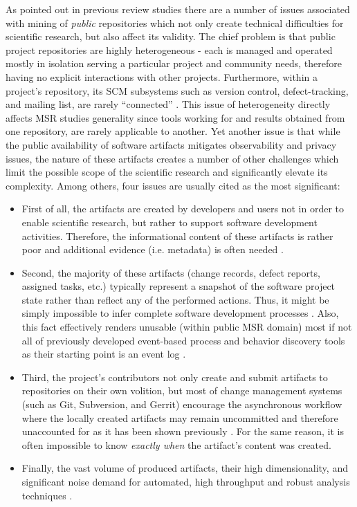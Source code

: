 As pointed out in previous review studies \cite{citeulike:12550438} \cite{citeulike:7853299} \cite{citeulike:7465518} there
are a number of issues associated with mining of \textit{public} repositories which not only create technical difficulties for 
scientific research, but also affect its validity. 
The chief problem is that public project repositories are highly heterogeneous - each is managed and operated 
mostly in isolation serving a particular project and community needs, therefore having no explicit interactions with 
other projects. 
Furthermore, within a project's repository, its SCM subsystems such as version control, defect-tracking, and mailing list, 
are rarely ``connected''  \cite{citeulike:13058334}. 
This issue of heterogeneity directly affects MSR studies generality since tools working for and results obtained from 
one repository, are rarely applicable to another.
Yet another issue is that while the public availability of software artifacts mitigates observability and privacy issues, 
the nature of these artifacts creates a number of other challenges which limit the possible scope of the scientific 
research and significantly elevate its complexity. Among others, four issues are usually cited as the most significant:
\begin{itemize}
 \item First of all, the artifacts are created by developers and users not in order to enable scientific research,
but rather to support software development activities. Therefore, the informational content of these artifacts is rather 
poor and additional evidence (i.e. metadata) is often needed \cite{citeulike:342840} \cite{citeulike:7954249} 
\cite{citeulike:7260421}.
 \item Second, the majority of these artifacts (change records, defect reports, assigned tasks, etc.) 
typically represent a snapshot of the software project state rather than reflect any of the performed actions.
Thus, it might be simply impossible to infer complete software development processes \cite{citeulike:1296888}.
Also, this fact effectively renders unusable (within public MSR domain) most if not all of previously developed 
event-based process and behavior discovery tools as their starting point is an event log \cite{citeulike:12944447}.
 \item Third, the project's contributors not only create and submit artifacts to repositories on their own volition,
but most of change management systems (such as Git, Subversion, and Gerrit) encourage the asynchronous workflow 
where the locally created artifacts may remain uncommitted and therefore unaccounted for as it has been shown previously
\cite{citeulike:2280690} \cite{citeulike:9037939}. 
For the same reason, it is often impossible to know \textit{exactly when} the artifact's content was created.
 \item Finally, the vast volume of produced artifacts, their high dimensionality, and significant noise demand 
 for automated, high throughput and robust analysis techniques 
 \cite{citeulike:12550438} \cite{citeulike:7853299} \cite{citeulike:4534888} \cite{citeulike:7549051}.
\end{itemize}

